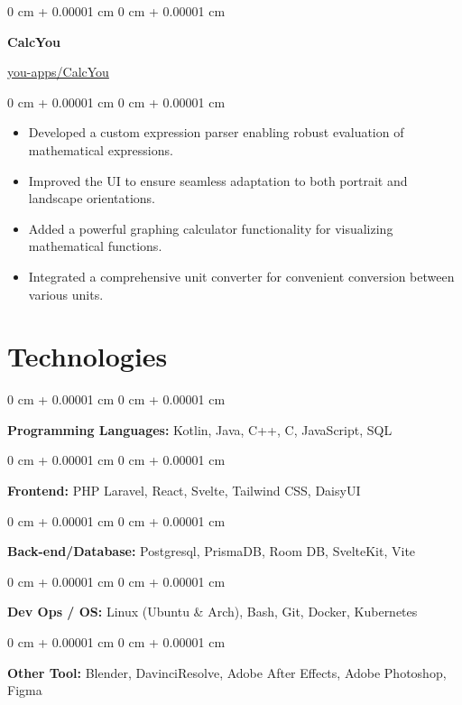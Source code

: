 \documentclass[10pt, letterpaper]{article}
\newenvironment{highlights}{
	\begin{itemize}[
		topsep=0.10 cm,
		parsep=0.10 cm,
		partopsep=0pt,
		itemsep=0pt,
		leftmargin=0 cm + 10pt
		]
	}{
	\end{itemize}
} %
\newenvironment{onecolentry}{
	\begin{adjustwidth}{
			0 cm + 0.00001 cm
		}{
			0 cm + 0.00001 cm
		}
	}{
	\end{adjustwidth}
} %
\newenvironment{twocolentry}[2][]{
	\onecolentry
	\def\secondColumn{#2}
	\setcolumnwidth{\fill, 4.5 cm}
	\begin{paracol}{2}
	}{
		\switchcolumn \raggedleft \secondColumn
	\end{paracol}
	\endonecolentry
} %
\begin{document}
	\vspace{0.2 cm}
	
	\begin{twocolentry}{\href{https://github.com/you-apps/CalcYou}{you-apps/CalcYou}}
		\textbf{CalcYou}
	\end{twocolentry}
	\vspace{0.10 cm}
	\begin{onecolentry}
		\begin{highlights}
			\item Developed a custom expression parser enabling robust evaluation of mathematical expressions.
			\item Improved the UI to ensure seamless adaptation to both portrait and landscape orientations.
			\item Added a powerful graphing calculator functionality for visualizing mathematical functions.
			\item Integrated a comprehensive unit converter for convenient conversion between various units.
		\end{highlights}
	\end{onecolentry}
	
	\vspace{0.2 cm}
	
	\section{Technologies}
	\begin{onecolentry}
		\textbf{Programming Languages:} Kotlin, Java, C++, C, JavaScript, SQL
	\end{onecolentry}
	
	\vspace{0.2 cm}
	
	\begin{onecolentry}
		\textbf{Frontend:} PHP Laravel, React, Svelte, Tailwind CSS, DaisyUI
	\end{onecolentry}
	
	\vspace{0.2 cm}
	
	\begin{onecolentry}
		\textbf{Back-end/Database:} Postgresql, PrismaDB, Room DB, SvelteKit, Vite
	\end{onecolentry}
	
	\vspace{0.2 cm}
	
	\begin{onecolentry}
		\textbf{Dev Ops / OS:} Linux (Ubuntu \& Arch), Bash, Git, Docker, Kubernetes
	\end{onecolentry}
	
	\vspace{0.2 cm}
	
	\begin{onecolentry}
		\textbf{Other Tool:} Blender, DavinciResolve, Adobe After Effects, Adobe Photoshop, Figma
	\end{onecolentry}
	
\end{document}
